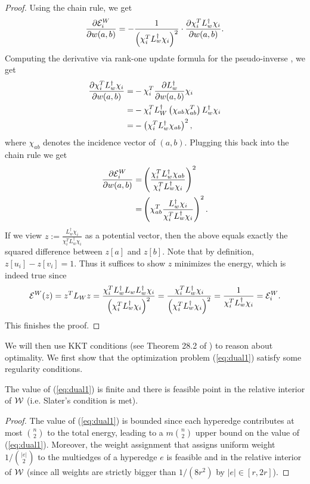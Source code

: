 \documentclass{article}
\begin{document}
\begin{proof}
Using the chain rule, we get
\begin{align*}
    \frac{\partial \mathcal{E}^W_{i}}{\partial w(a,b)} =
    - \frac{1}{\left(\chi_i^T L_w^{\dag} \chi_i\right)^2}\cdot
    \frac{\partial \chi_i^T L_w^{\dag} \chi_i}{\partial w(a,b)}.
\end{align*}
Computing the derivative
via rank-one update formula for the pseudo-inverse \cite{ShermanM50,Meyer73}, we get
\begin{align*}
    \frac{\partial \chi_i^T L_w^{\dag} \chi_i}{\partial w(a,b)} =
    & -\chi_i^T \frac{\partial L_w^{\dag}}{\partial w(a,b)} \chi_i \\
    = &
    - \chi_i^T L_W^{\dag} \left( \chi_{ab} \chi_{ab}^T\right) L_w^{\dag} \chi_i \\
    = &
    - \left( \chi_i^T L_w^{\dag} \chi_{ab} \right)^2,
\end{align*}
where $\chi_{ab}$ denotes the incidence vector of $(a,b)$.
Plugging this back into the chain rule we get
\begin{align*}
    \frac{\partial \mathcal{E}^W_{i}}{\partial w(a,b)} =
    & \left( \frac{\chi_i^T L_w^{\dag} \chi_{ab}}{\chi_i^T L_w^{\dag} \chi_{i}} \right)^2 \\
    = &
    \left( \chi_{ab}^T \frac{L_w^{\dag} \chi_i}{\chi_i^T L_w^{\dag} \chi_{i}} \right)^2.
\end{align*}
If we view $z := \frac{L_w^{\dag} \chi_i}{\chi_i^T L_w^{\dag} \chi_{i}}$ as a potential vector,
then the above equals exactly
the squared difference between $z[a]$ and $z[b]$.
Note that by definition, $z[u_i] - z[v_i] = 1$.
Thus it suffices to show $z$ minimizes the energy, which is indeed true since
\begin{align*}
    \mathcal{E}^W(z) = z^T L_W z =
    \frac{\chi_i^T L_w^{\dag} L_w L_w^{\dag} \chi_i}{\left(\chi_i^T L_w^{\dag} \chi_{i}\right)^2}
    = 
    \frac{\chi_i^T L_w^{\dag} \chi_i}{\left(\chi_i^T L_w^{\dag} \chi_{i}\right)^2} =
    \frac{1}{\chi_i^T L_w^{\dag} \chi_{i}} = \mathcal{E}_i^{W}.
\end{align*}
This finishes the proof.
\end{proof}

We will then use KKT conditions 
(see Theorem 28.2 of \cite{Rockafellar70})
to reason about optimality.
We first show that the optimization problem (\ref{eq:dual1}) satisfy some regularity conditions.

\begin{proposition}
    The value of (\ref{eq:dual1}) is finite and there is feasible point in the relative 
    interior of $\mathcal{W}$ (i.e. Slater's condition is met).
\end{proposition}
\begin{proof}
    The value of (\ref{eq:dual1}) is bounded since each
    hyperedge contributes at most $\binom{n}{2}$ to the total energy,
    leading to a $m \binom{n}{2}$ upper bound on the value of (\ref{eq:dual1}).
    Moreover, the weight assignment that assigns uniform weight $1/\binom{|e|}{2}$
    to the multiedges of a hyperedge $e$ is feasible and in the relative interior
    of $\mathcal{W}$ (since all weights are strictly bigger than $1/(8r^2)$ by
    $|e|\in [r,2r]$).
\end{proof}
\end{document}
